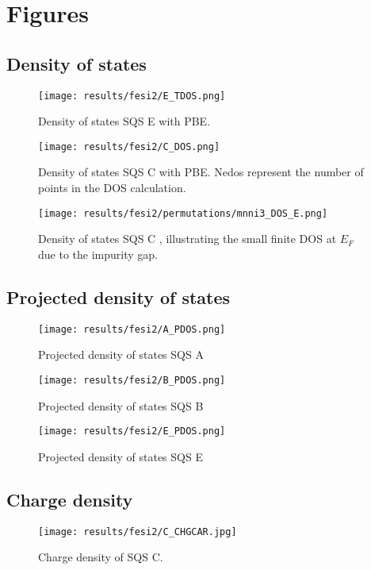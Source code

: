 \chapter{Figures}
\label{appendix:equi}

\section{Density of states}

\begin{figure}[H]
	\centering
	\texttt{[image: results/fesi2/E\_TDOS.png]}
	\caption{Density of states SQS E  with PBE.}
\end{figure}

\begin{figure}[H]
	\centering
	\texttt{[image: results/fesi2/C\_DOS.png]}
	\caption{Density of states SQS C  with PBE. Nedos represent the number of points in the DOS calculation.}
\end{figure}

\begin{figure}[H]
\texttt{[image: results/fesi2/permutations/mnni3\_DOS\_E.png]}
\caption{Density of states SQS C , illustrating the small finite DOS at $E_F$ due to the impurity gap.}
\end{figure}

\section{Projected density of states}

\begin{figure}[H]
\texttt{[image: results/fesi2/A\_PDOS.png]}
\caption{Projected density of states SQS A}
\end{figure}

\begin{figure}[H]
\texttt{[image: results/fesi2/B\_PDOS.png]}
\caption{Projected density of states SQS B}
\end{figure}

\begin{figure}[H]
\texttt{[image: results/fesi2/E\_PDOS.png]}
\caption{Projected density of states SQS E}
\end{figure}

\section{Charge density}

\begin{figure}[H]
\texttt{[image: results/fesi2/C\_CHGCAR.jpg]}
\caption{Charge density of SQS C.}
\end{figure}

